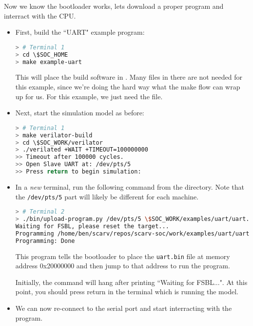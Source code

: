 \noindent
Now we know the bootloader works, lets download a proper program
and interract with the CPU.

\begin{itemize}

\item
    First, build the ``UART" example program:

\begin{lstlisting}[language=bash,style=block]
> # Terminal 1
> cd \$SOC_HOME
> make example-uart
\end{lstlisting}

    This will place the build software in
    .
    Many files in there are not needed for this example, since we're doing
    the hard way what the make flow can wrap up for us.
    For this example, we just need the
    file.

\item Next, start the simulation model as before:

\begin{lstlisting}[language=bash,style=block]
> # Terminal 1
> make verilator-build
> cd \$SOC_WORK/verilator
> ./verilated +WAIT +TIMEOUT=100000000
>> Timeout after 100000 cycles.
>> Open Slave UART at: /dev/pts/5
>> Press return to begin simulation:
\end{lstlisting}

\item In a {\em new} terminal, run the following command from the
    \SOCHOME directory. Note that the {\tt /dev/pts/5} part will
    likely be different for each machine.

\begin{lstlisting}[language=bash,style=block]
> # Terminal 2
> ./bin/upload-program.py /dev/pts/5 \$SOC_WORK/examples/uart/uart.bin 0x20000000 
Waiting for FSBL, please reset the target...
Programming /home/ben/scarv/repos/scarv-soc/work/examples/uart/uart.bin, size=300, start=0x20000000
Programming: Done
\end{lstlisting}

    This program tells the bootloader to place the {\tt uart.bin}
    file at memory address {0x20000000} and then jump to that
    address to run the program.

    Initially, the command will hang after printing ``Waiting for FSBL...".
    At this point, you should press return in the terminal which is running
    the model.

\item We can now re-connect to the serial port and start interracting
    with the program.


\end{itemize}
